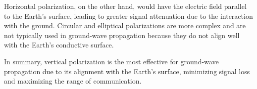 Horizontal polarization, on the other hand, would have the electric field parallel to the Earth's surface, leading to greater signal attenuation due to the interaction with the ground. Circular and elliptical polarizations are more complex and are not typically used in ground-wave propagation because they do not align well with the Earth's conductive surface.

In summary, vertical polarization is the most effective for ground-wave propagation due to its alignment with the Earth's surface, minimizing signal loss and maximizing the range of communication.

